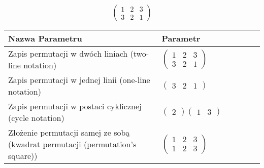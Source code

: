 \documentclass[12pt]{article}
\begin{document}
\subsection{}
\begin{center}
\[
\begin{pmatrix}
	1 & 2 & 3 \\ 
	3 & 2 & 1 
\end{pmatrix}
\]

\begin{tabular}{|m{0.6\linewidth}|m{0.4\linewidth}|}
	\hline
	Nazwa Parametru & Parametr \\
	\hline
	Zapis permutacji w dwóch liniach (two-line notation) & $\begin{pmatrix} 1 & 2 & 3 \\ 
3 & 2 & 1 \end{pmatrix}$ \\ 
	\hline
	Zapis permutacji w jednej linii (one-line notation) & $\begin{pmatrix} 3 & 2 & 1 \end{pmatrix}$ \\ 
	\hline
	Zapis permutacji w postaci cyklicznej (cycle notation) & $\begin{pmatrix} 2 \end{pmatrix} \begin{pmatrix} 1 & 3 \end{pmatrix} $ \\ 
	\hline
	Złożenie permutacji samej ze sobą (kwadrat permutacji (permutation's square)) & $\begin{pmatrix} 1 & 2 & 3 \\ 
1 & 2 & 3 \end{pmatrix}$ \\ 
	\hline
\end{tabular}
\end{center}
\end{document}
